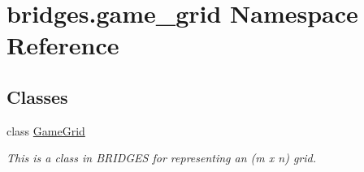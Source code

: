 \hypertarget{namespacebridges_1_1game__grid}{}\section{bridges.\+game\+\_\+grid Namespace Reference}
\label{namespacebridges_1_1game__grid}
\subsection*{Classes}
\begin{DoxyCompactItemize}
\item 
class \mbox{\hyperlink{classbridges_1_1game__grid_1_1_game_grid}{Game\+Grid}}
\begin{DoxyCompactList}\small\item\em This is a class in B\+R\+I\+D\+G\+ES for representing an (m x n) grid. \end{DoxyCompactList}\end{DoxyCompactItemize}

